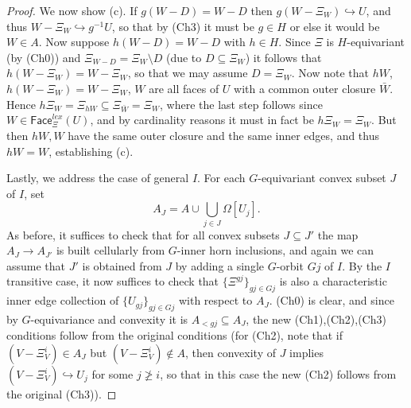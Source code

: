 \documentclass[a4paper,10pt
 ,draft
]{article}%
\begin{document}
\begin{proof}
We now show (c).
If $g(W-D) = W-D$ then $g(W - \Xi_W) \hookrightarrow U$,
and thus $W - \Xi_W \hookrightarrow g^{-1}U$,
so that by (Ch3) it must be $g \in H$ or else it would be $W \in A$.
Now suppose $h(W-D)=W-D$ with $h\in H$.
Since $\Xi$ is $H$-equivariant (by (Ch0)) and
$\Xi_{W-D} = \Xi_{W} \setminus D$ (due to $D \subseteq \Xi_{W}$) it follows that 
$h(W-\Xi_W) = W-\Xi_W$,
so that we may assume $D = \Xi_W$.
Now note that
$hW$, $h(W-\Xi_W)=W-\Xi_W$, $W$
are all faces of $U$ with a common outer closure $\bar{W}$.
Hence
$h\Xi_{W} = \Xi_{hW} \subseteq \Xi_{\bar{W}} = \Xi_{W}$, where the last step follows since
$W \in \mathsf{Face}_{\Xi}^{lex}(U)$, and by cardinality reasons it must in fact be $h \Xi_{W} = \Xi_{W}$. But then $hW,W$
have the same outer closure and the same inner edges, and thus 
$hW=W$, establishing (c).

Lastly, we address the case of general $I$.
For each $G$-equivariant convex subset $J$ of $I$, set
\[
	A_J = 
	A \cup \bigcup_{j \in J} \Omega[U_j].
\]
As before, it suffices to check that for all convex subsets
$J \subseteq J'$
the map $A_J \to A_{J'}$ is built cellularly from $G$-inner horn inclusions,
and again we can assume that $J'$ is obtained from $J$ by adding a single $G$-orbit $Gj$ of $I$.
By the $I$ transitive case, it now suffices to check that
$\{\Xi^{gj}\}_{gj \in Gj}$ is also a characteristic inner edge collection of $\{U_{g j}\}_{g j \in Gj}$ with respect to $A_J$.
(Ch0) is clear, and since by $G$-equivariance and convexity it is $A_{<gj} \subseteq A_J$,
the new (Ch1),(Ch2),(Ch3)
conditions follow from the original conditions
(for (Ch2), note that if 
$(V - \Xi^i_V) \in A_J$ but $(V - \Xi^i_V) \nin A$, then convexity of $J$ implies $(V - \Xi^i_V) \hookrightarrow U_j$ for some $j \not \geq i$, so that in this case the new (Ch2) follows from the original (Ch3)).
\end{proof}
\end{document}

